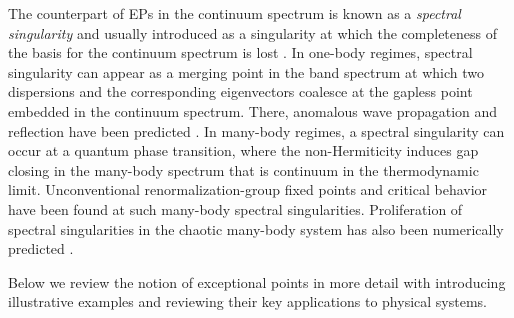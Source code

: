 \documentclass{tADP2e}
\theoremstyle{plain}
\theoremstyle{plain}
\theoremstyle{definition}
\begin{document}
The counterpart of EPs in the continuum spectrum is known as a {\it spectral singularity} and usually introduced as a singularity at which the completeness of the basis for the continuum spectrum is lost \cite{N60}. In one-body regimes, spectral singularity can appear as a merging point in the band spectrum at which two dispersions and the corresponding eigenvectors coalesce at the gapless point embedded in the continuum spectrum. There, anomalous wave propagation and reflection have been predicted \cite{AM09,LSS10,MA15}. In many-body regimes, a spectral singularity can occur at a quantum phase transition, where the non-Hermiticity induces gap closing in the many-body spectrum that is continuum in the thermodynamic limit. Unconventional renormalization-group fixed points \cite{YA17nc} and critical behavior \cite{IY16} have been found at such many-body spectral singularities. Proliferation of spectral singularities in the chaotic many-body system has also been numerically predicted \cite{LDJ19}. 

Below we review the notion of exceptional points in more detail with introducing illustrative examples and reviewing their key applications to physical systems.
\end{document}
